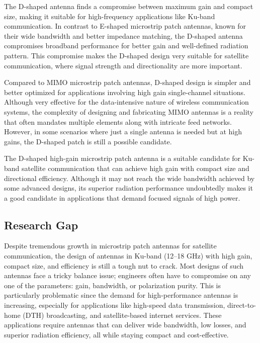\documentclass[12pt]{article}
\begin{document}
\par The D-shaped antenna finds a compromise between maximum gain and compact size, making it suitable for high-frequency applications like Ku-band communication. In contrast to E-shaped microstrip patch antennas, known for their wide bandwidth and better impedance matching, the D-shaped antenna compromises broadband performance for better gain and well-defined radiation pattern. This compromise makes the D-shaped design very suitable for satellite communication, where signal strength and directionality are more important.\\

\par Compared to MIMO microstrip patch antennas, D-shaped design is simpler and better optimized for applications involving high gain single-channel situations. Although very effective for the data-intensive nature of wireless communication systems, the complexity of designing and fabricating MIMO antennas is a reality that often mandates multiple elements along with intricate feed networks. However, in some scenarios where just a single antenna is needed but at high gains, the D-shaped patch is still a possible candidate.\\

\par The D-shaped high-gain microstrip patch antenna is a suitable candidate for Ku-band satellite communication that can achieve high gain with compact size and directional efficiency. Although it may not reach the wide bandwidth achieved by some advanced designs, its superior radiation performance undoubtedly makes it a good candidate in applications that demand focused signals of high power.\\



\newpage
\subsection{Research Gap}

\par Despite tremendous growth in microstrip patch antennas for satellite communication, the design of antennas in Ku-band (12–18 GHz) with high gain, compact size, and efficiency is still a tough nut to crack. Most designs of such antennas face a tricky balance issue; engineers often have to compromise on any one of the parameters: gain, bandwidth, or polarization purity. This is particularly problematic since the demand for high-performance antennas is increasing, especially for applications like high-speed data transmission, direct-to-home (DTH) broadcasting, and satellite-based internet services. These applications require antennas that can deliver wide bandwidth, low losses, and superior radiation efficiency, all while staying compact and cost-effective.\\
\end{document}
